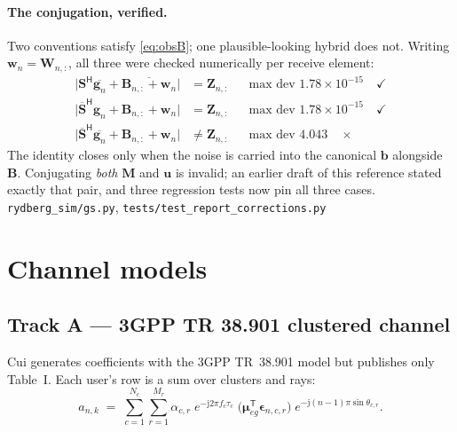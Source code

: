 \documentclass[11pt,a4paper]{article}
\newcommand{\src}[1]{{\footnotesize\color{srcgray}\texttt{#1}}}
\newcommand{\herm}{\mathsf{H}}
\newcommand{\trans}{\mathsf{T}}
\newcommand{\mat}[1]{\mathbf{#1}}
\newcommand{\vect}[1]{\mathbf{#1}}
\newcommand{\jj}{\mathrm{j}}
\begin{document}
\paragraph{The conjugation, verified.}
Two conventions satisfy \eqref{eq:obsB}; one plausible-looking hybrid does
not. Writing $\vect{w}_n=\mat{W}_{n,:}$, all three were checked numerically
per receive element:
\begin{align}
\bigl|\mat{S}^{\herm}\overline{\vect{g}_n}
      + \overline{\mat{B}_{n,:}+\vect{w}_n}\bigr|
  &= \mat{Z}_{n,:} && \text{max dev } 1.78\times10^{-15} \quad\checkmark
  \label{eq:conv2}\\
\bigl|\overline{\mat{S}}^{\herm}\vect{g}_n
      + \mat{B}_{n,:}+\vect{w}_n\bigr|
  &= \mat{Z}_{n,:} && \text{max dev } 1.78\times10^{-15} \quad\checkmark
  \label{eq:conv1}\\
\bigl|\overline{\mat{S}}^{\herm}\overline{\vect{g}_n}
      + \mat{B}_{n,:}+\vect{w}_n\bigr|
  &\neq \mat{Z}_{n,:} && \text{max dev } 4.043 \quad\times
\end{align}
The identity closes only when the noise is carried into the canonical
$\vect{b}$ alongside $\mat{B}$. Conjugating \emph{both} $\mat{M}$ and
$\vect{u}$ is invalid; an earlier draft of this reference stated exactly that
pair, and three regression tests now pin all three cases.
\src{rydberg\_sim/gs.py}, \src{tests/test\_report\_corrections.py}

\section{Channel models}\label{sec:channels}

\subsection{Track A --- 3GPP TR 38.901 clustered channel}
Cui generates coefficients with the 3GPP TR~38.901 model but publishes only
Table~I. Each user's row is a sum over clusters and rays:
\begin{equation}
a_{n,k} \;=\; \sum_{c=1}^{N_c}\sum_{r=1}^{M_r}
  \alpha_{c,r}\;
  e^{-\jj 2\pi f_c \tau_c}\;
  \bigl(\boldsymbol{\mu}_{eg}^{\trans}\boldsymbol{\epsilon}_{n,c,r}\bigr)\;
  e^{-\jj (n-1)\pi\sin\theta_{c,r}} .
\label{eq:chA}
\end{equation}
\end{document}
